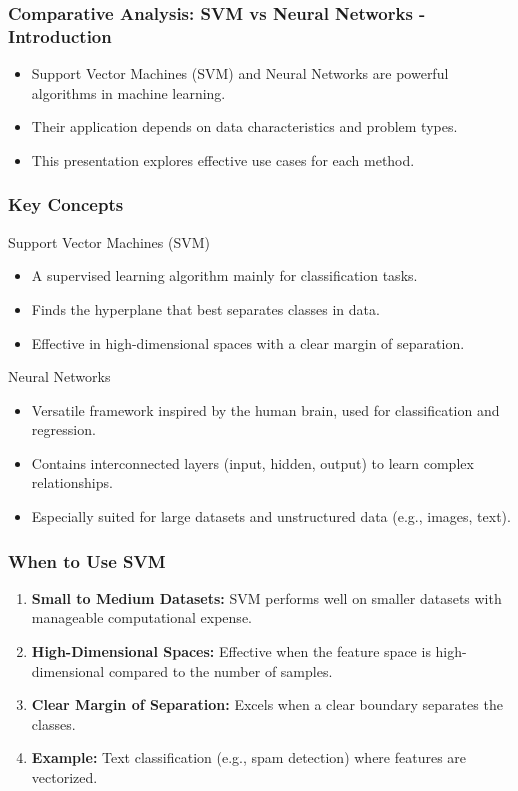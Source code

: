 \documentclass[aspectratio=169]{beamer}
\begin{document}
\begin{frame}[fragile]
    \frametitle{Comparative Analysis: SVM vs Neural Networks - Introduction}
    \begin{itemize}
        \item Support Vector Machines (SVM) and Neural Networks are powerful algorithms in machine learning.
        \item Their application depends on data characteristics and problem types.
        \item This presentation explores effective use cases for each method.
    \end{itemize}
\end{frame}

\begin{frame}[fragile]
    \frametitle{Key Concepts}
    \begin{block}{Support Vector Machines (SVM)}
        \begin{itemize}
            \item A supervised learning algorithm mainly for classification tasks.
            \item Finds the hyperplane that best separates classes in data.
            \item Effective in high-dimensional spaces with a clear margin of separation.
        \end{itemize}
    \end{block}
    
    \begin{block}{Neural Networks}
        \begin{itemize}
            \item Versatile framework inspired by the human brain, used for classification and regression.
            \item Contains interconnected layers (input, hidden, output) to learn complex relationships.
            \item Especially suited for large datasets and unstructured data (e.g., images, text).
        \end{itemize}
    \end{block}
\end{frame}

\begin{frame}[fragile]
    \frametitle{When to Use SVM}
    \begin{enumerate}
        \item \textbf{Small to Medium Datasets:} SVM performs well on smaller datasets with manageable computational expense.
        \item \textbf{High-Dimensional Spaces:} Effective when the feature space is high-dimensional compared to the number of samples.
        \item \textbf{Clear Margin of Separation:} Excels when a clear boundary separates the classes. 
        \item \textbf{Example:} Text classification (e.g., spam detection) where features are vectorized.
    \end{enumerate}
\end{frame}
\end{document}

